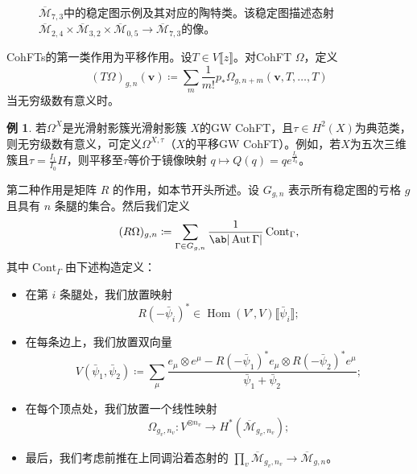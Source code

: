 \documentclass{amsart}
\theoremstyle{definition}
\newtheorem{exm}[thm]{例}
\theoremstyle{remark}
\theoremstyle{plain}
\theoremstyle{definition}
\theoremstyle{remark}
\newcommand{\Mbar}{\overline{\mathcal{M}}}
\newcommand{\mc}[1]{\mathcal{#1}}
\newcommand{\mbf}[1]{\mathbf{#1}}
\newcommand{\bv}{\mbf{v}}
\newcommand{\on}[1]{\operatorname{#1}}
\newcommand{\ol}[1]{\overline{#1}}
\newcommand{\1}{\mathbf{1}}
\newcommand{\2}{\mathbf{2}}
\newcommand{\3}{\mathbf{3}}
\newcommand{\ps}[1]{\llbracket #1 \rrbracket}
\DeclareMathOperator{\Hom}{Hom}
\DeclareMathOperator{\Aut}{Aut}
\begin{document}
\begin{figure}[htpb]
  \centering
  \caption{$\ol{\mc{M}}_{7,3}$中的稳定图示例及其对应的陶特类。该稳定图描述态射$\ol{\mc{M}}_{2,4} \times \ol{\mc{M}}_{3,2} \times \ol{\mc{M}}_{0,5} \to \ol{\mc{M}}_{7,3}$的像。}
  \label{fig:stablegraph}
\end{figure}

CohFTs的第一类作用为平移作用。设$T \in V\ps{z}$。对CohFT $\Omega$，定义
\[ (T\Omega)_{g,n}(\bv) \coloneqq \sum_m \frac{1}{m!} p_* \Omega_{g,n+m}(\bv, T,\ldots,T) \]
当无穷级数有意义时。

\begin{exm}
若$\Omega^X$是光滑射影簇光滑射影簇 $X$的GW CohFT，且$\tau \in H^2(X)$为典范类，则无穷级数有意义，可定义$\Omega^{X,\tau}$（$X$的平移GW CohFT）。例如，若$X$为五次三维簇且$\tau = \frac{I_1}{I_0} H$，则平移至$\tau$等价于镜像映射 $q \mapsto Q(q) = q e^{\frac{I_1}{I_0}}$。
\end{exm}

第二种作用是矩阵 $R$ 的作用，如本节开头所述。设 $G_{g,n}$ 表示所有稳定图的亏格 $g$ 且具有 $n$ 条腿的集合。然后我们定义
\[ (R\Omega)_{g,n} \coloneqq \sum_{\Gamma \in G_{g,n}} \frac{1}{\ab|\Aut \Gamma|} \on{Cont}_{\Gamma}, \]
其中$\on{Cont}_{\Gamma}$由下述构造定义：
\begin{itemize}
    \item 在第 $i$ 条腿处，我们放置映射
        \[ R(-\bar{\psi}_i)^* \in \Hom(V',V) \ps{\bar{\psi}_i}; \]
    \item 在每条边上，我们放置双向量
        \[ V(\bar{\psi}_1, \bar{\psi}_2) \coloneqq \sum_{\mu} \frac{e_{\mu} \otimes e^{\mu} - R(-\bar{\psi}_1)^* e_{\mu} \otimes R(-\bar{\psi}_2)^* e^{\mu}}{\bar{\psi}_1 + \bar{\psi}_2}; \]
    \item 在每个顶点处，我们放置一个线性映射
        \[ \Omega_{g_v, n_v} \colon V^{\otimes n_v} \to H^*(\Mbar_{g_v, n_v}); \]
    \item 最后，我们考虑前推在上同调沿着态射的 $\prod_v \Mbar_{g_v, n_v} \to \Mbar_{g,n}$。
\end{itemize}
\end{document}
